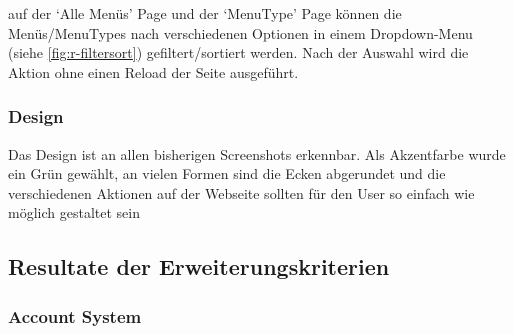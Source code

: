 auf der `Alle Menüs' Page und der `MenuType' Page können die Menüs/MenuTypes
nach verschiedenen Optionen in einem Dropdown-Menu (siehe
\ref{fig:r-filtersort}) gefiltert/sortiert werden. Nach der Auswahl wird die
Aktion ohne einen Reload der Seite ausgeführt.

\subsubsection*{Design}
Das Design ist an allen bisherigen Screenshots erkennbar. Als Akzentfarbe wurde
ein Grün gewählt, an vielen Formen sind die Ecken abgerundet und die
verschiedenen Aktionen auf der Webseite sollten für den User so einfach wie
möglich gestaltet sein



\subsection{Resultate der Erweiterungskriterien}

\subsubsection*{Account System}

